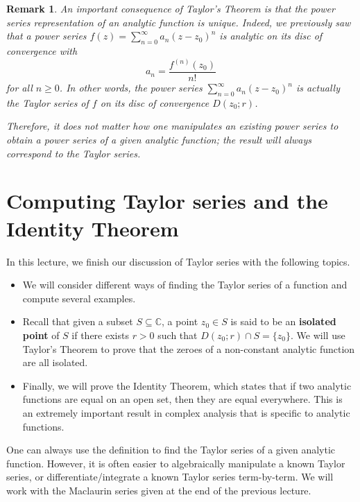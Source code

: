 \documentclass[10pt]{article}
\newcommand{\C}{\mathbb{C}}
\theoremstyle{newstyle}
\newtheorem{remark}[thm]{Remark}
\begin{document}
\begin{remark}
An important consequence of Taylor's Theorem is that the power series representation of an 
analytic function is unique. Indeed, we previously saw that a power series 
$f(z) = \sum_{n=0}^\infty a_n (z-z_0)^n$ is analytic on its disc of convergence with 
\[ a_n = \frac{f^{(n)}(z_0)}{n!} \]
for all $n \geq 0$. In other words, the power series $\sum_{n=0}^\infty a_n(z-z_0)^n$ is actually 
the Taylor series of $f$ on its disc of convergence $D(z_0; r)$. 

Therefore, it does not matter how one manipulates an existing power series to obtain a power 
series of a given analytic function; the result will always correspond to the Taylor series. 
\end{remark}

\newpage 
\section{Computing Taylor series and the Identity Theorem}

In this lecture, we finish our discussion of Taylor series with the following topics.
\begin{itemize}
    \item We will consider different ways of finding the Taylor series of a function 
    and compute several examples.
    \item Recall that given a subset $S \subseteq \C$, 
    a point $z_0 \in S$ is said to be an {\bf isolated point} of $S$ if there 
    exists $r > 0$ such that $D(z_0; r) \cap S = \{z_0\}$. 
    We will use Taylor's Theorem to prove that the zeroes of a non-constant 
    analytic function are all isolated. 
    \item Finally, we will prove the Identity Theorem, which states that if two analytic functions 
    are equal on an open set, then they are equal everywhere. This is an extremely important 
    result in complex analysis that is specific to analytic functions.
\end{itemize}

One can always use the definition to find the Taylor series of a given analytic function. 
However, it is often easier to algebraically manipulate a known Taylor series, or 
differentiate/integrate a known Taylor series term-by-term. We will work with the 
Maclaurin series given at the end of the previous lecture. 
\end{document}

